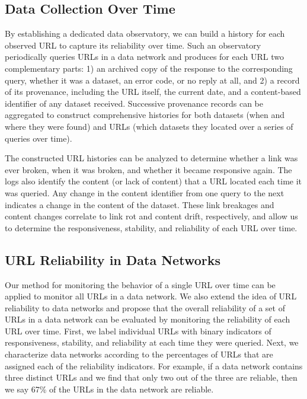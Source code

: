 \subsection*{Data Collection Over Time}
By establishing a dedicated data observatory, we can build a history for each observed URL to capture its reliability over time. Such an observatory periodically queries URLs in a data network and produces for each URL two complementary parts: 1) an archived copy of the response to the corresponding query, whether it was a dataset, an error code, or no reply at all, and 2) a record of its provenance, including the URL itself, the current date, and a content-based identifier of any dataset received. Successive provenance records can be aggregated to construct comprehensive histories for both datasets (when and where they were found) and URLs (which datasets they located over a series of queries over time).

The constructed URL histories can be analyzed to determine whether a link was ever broken, when it was broken, and whether it became responsive again. The logs also identify the content (or lack of content) that a URL located each time it was queried. Any change in the content identifier from one query to the next indicates a change in the content of the dataset. These link breakages and content changes correlate to link rot and content drift, respectively, and allow us to determine the responsiveness, stability, and reliability of each URL over time.

\subsection*{URL Reliability in Data Networks}
Our method for monitoring the behavior of a single URL over time can be applied to monitor all URLs in a data network. We also extend the idea of URL reliability to data networks and propose that the overall reliability of a set of URLs in a data network can be evaluated by monitoring the reliability of each URL over time. First, we label individual URLs with binary indicators of responsiveness, stability, and reliability at each time they were queried. Next, we characterize data networks according to the percentages of URLs that are assigned each of the reliability indicators. For example, if a data network contains three distinct URLs and we find that only two out of the three are reliable, then we say 67\% of the URLs in the data network are reliable.

